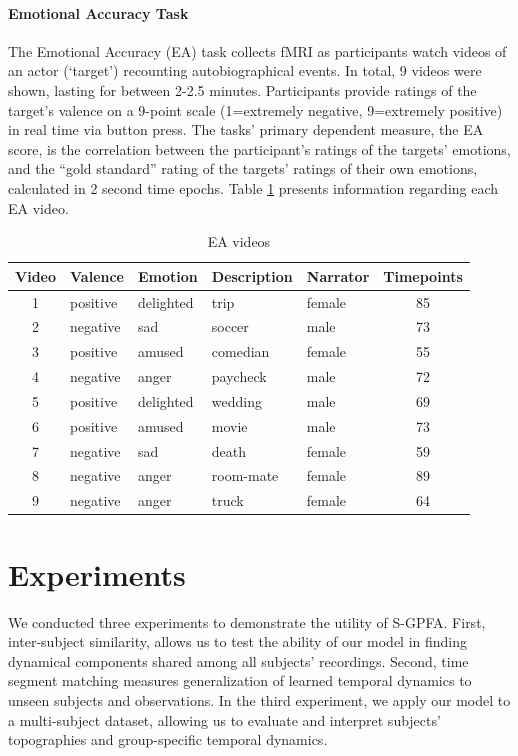 \paragraph{Emotional Accuracy Task}
The Emotional Accuracy (EA) task collects fMRI as participants watch videos of an actor (‘target’) recounting autobiographical events. In total, 9 videos were shown, lasting for between 2-2.5 minutes. Participants provide ratings of the target’s valence on a 9-point scale (1=extremely negative, 9=extremely positive) in real time via button press. The tasks' primary dependent measure, the EA score, is the correlation between the participant’s ratings of the targets’ emotions, and the “gold standard” rating of the targets’ ratings of their own emotions, calculated in 2 second time epochs. Table \ref{ch1:tab:ea} presents information regarding each EA video.


\begin{table}[h]
  \caption{EA videos}
  \label{ch1:tab:ea}
    \centering
    \begin{tabular}{c l l l l c}
        \toprule
        \cmidrule(r){1-2}
        Video & Valence &	Emotion &	Description &	Narrator &	Timepoints \\ 
        \midrule
        1 & positive &	delighted &	trip &	female &	85 \\
        2 & negative &	sad &	soccer &	male &	73 \\
        3 & positive &	amused &	comedian &	female &	55 \\
        4 & negative &	anger &	paycheck &	male &	72 \\
        5 & positive &	delighted &	wedding &	male &	69 \\
        6 & positive &	amused &	movie &	male &	73 \\
        7 & negative &	sad &	death &	female &	59 \\
        8 & negative &	anger &	room-mate &	female &	89 \\
        9 & negative &	anger &	truck &	female &	64 \\
        \bottomrule
    \end{tabular}
\end{table}



\section{Experiments}
\label{ch1:sec:experiments}

We conducted three experiments to demonstrate the utility of S-GPFA. First, inter-subject similarity, allows us to test the ability of our model in finding dynamical components shared among all subjects' recordings. Second, time segment matching measures generalization of learned temporal dynamics to unseen subjects and observations. In the third experiment, we apply our model to a multi-subject dataset, allowing us to evaluate and interpret subjects' topographies and group-specific temporal dynamics.


